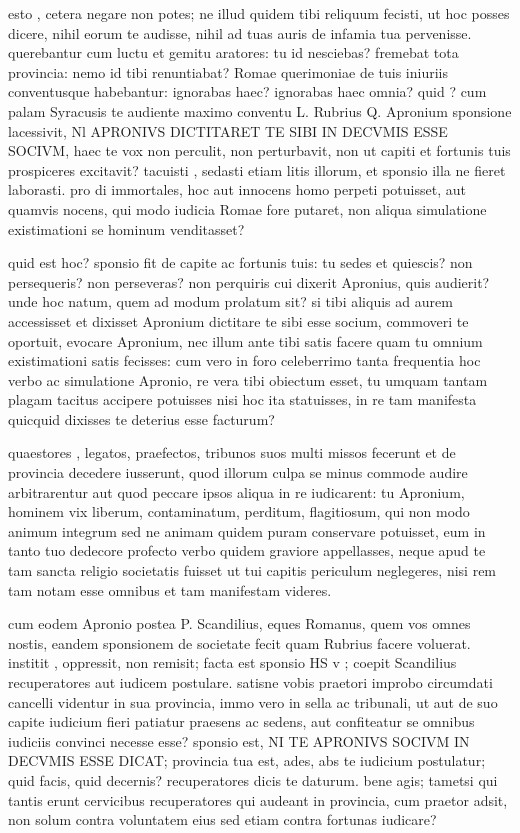  esto , cetera negare non potes; ne illud quidem tibi reliquum fecisti, ut hoc posses dicere, nihil eorum te audisse, nihil ad tuas auris de infamia tua pervenisse. querebantur cum luctu et gemitu aratores: tu id nesciebas? fremebat tota provincia: nemo id tibi renuntiabat? Romae querimoniae de tuis iniuriis conventusque habebantur: ignorabas haec? ignorabas haec omnia? quid ? cum palam Syracusis te audiente maximo conventu L. Rubrius Q. Apronium sponsione lacessivit, Nl APRONIVS DICTITARET TE SIBI IN DECVMIS ESSE SOCIVM, haec te vox non perculit, non perturbavit, non ut capiti et fortunis tuis prospiceres excitavit? tacuisti , sedasti etiam litis illorum, et sponsio illa ne fieret laborasti. pro di immortales, hoc aut innocens homo perpeti potuisset, aut quamvis nocens, qui modo iudicia Romae fore putaret, non aliqua simulatione existimationi se hominum venditasset?

 quid est hoc? sponsio fit de capite ac fortunis tuis: tu sedes et quiescis? non persequeris? non perseveras? non perquiris cui dixerit Apronius, quis audierit? unde hoc natum, quem ad modum prolatum sit? si tibi aliquis ad aurem accessisset et dixisset Apronium dictitare te sibi esse socium, commoveri te oportuit, evocare Apronium, nec illum ante tibi satis facere quam tu omnium existimationi satis fecisses: cum vero in foro celeberrimo tanta frequentia hoc verbo ac simulatione Apronio, re vera tibi obiectum esset, tu umquam tantam plagam tacitus accipere potuisses nisi hoc ita statuisses, in re tam manifesta quicquid dixisses te deterius esse facturum?

 quaestores , legatos, praefectos, tribunos suos multi missos fecerunt et de provincia decedere iusserunt, quod illorum culpa se minus commode audire arbitrarentur aut quod peccare ipsos aliqua in re iudicarent: tu Apronium, hominem vix liberum, contaminatum, perditum, flagitiosum, qui non modo animum integrum sed ne animam quidem puram conservare potuisset, eum in tanto tuo dedecore profecto verbo quidem graviore appellasses, neque apud te tam sancta religio societatis fuisset ut tui capitis periculum neglegeres, nisi rem tam notam esse omnibus et tam manifestam videres.

 cum eodem Apronio postea P. Scandilius, eques Romanus, quem vos omnes nostis, eandem sponsionem de societate fecit quam Rubrius facere voluerat. institit , oppressit, non remisit; facta est sponsio HS v ; coepit Scandilius recuperatores aut iudicem postulare. satisne vobis praetori improbo circumdati cancelli videntur in sua provincia, immo vero in sella ac tribunali, ut aut de suo capite iudicium fieri patiatur praesens ac sedens, aut confiteatur se omnibus iudiciis convinci necesse esse? sponsio est, NI TE APRONIVS SOCIVM IN DECVMIS ESSE DICAT; provincia tua est, ades, abs te iudicium postulatur; quid facis, quid decernis? recuperatores dicis te daturum. bene agis; tametsi qui tantis erunt cervicibus recuperatores qui audeant in provincia, cum praetor adsit, non solum contra voluntatem eius sed etiam contra fortunas iudicare?

